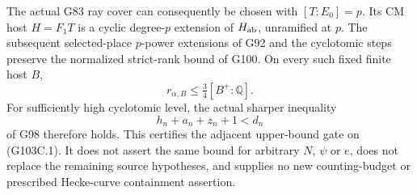 \begin{theorem}
The actual G83 ray cover can consequently be chosen with $[T:E_0]=p$.
Its CM host $H=F_1T$ is a cyclic degree-$p$ extension of $H_{\rm ab}$,
unramified at $p$.  The subsequent selected-place $p$-power extensions
of G92 and the cyclotomic steps preserve the normalized strict-rank
bound of G100.  On every such fixed finite host $B$,
\[
              r_{\alpha,B}\le\tfrac34[B^+:\mathbb Q].
                                                        \tag{G103C.5}
\]
For sufficiently high cyclotomic level, the actual sharper inequality
\[
                    h_n+a_n+z_n+1<d_n                 \tag{G103C.6}
\]
of G98 therefore holds.  This certifies the adjacent upper-bound gate
on (G103C.1).  It does not assert the same bound for arbitrary $N$, $\psi$
or $e$, does not replace the remaining source hypotheses, and supplies
no new counting-budget or prescribed Hecke-curve containment assertion.
\end{theorem}

